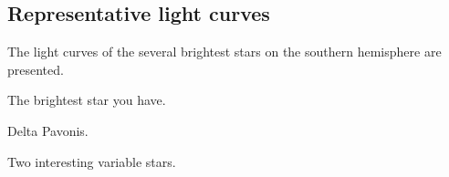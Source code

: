 \documentclass{aa}
\begin{document}
\subsection{Representative light curves}
The light curves of the several brightest stars on the southern hemisphere are presented.

The brightest star you have.

Delta Pavonis.

Two interesting variable stars.




\end{document}
